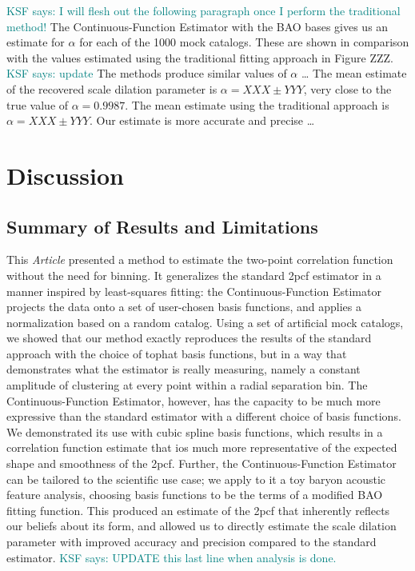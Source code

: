 \documentclass[modern]{aastex62}
\newcommand{\cf}{2pcf\xspace} %
\newcommand{\Est}{The Continuous-Function Estimator\xspace}
\newcommand{\est}{the Continuous-Function Estimator\xspace}
\newcommand{\documentname}{\textsl{Article}\xspace}
\newcommand{\KSF}[1]{\textcolor{teal}{KSF says: #1}}
\begin{document}
\KSF{I will flesh out the following paragraph once I perform the traditional method!}
\Est with the BAO bases gives us an estimate for $\alpha$ for each of the 1000 mock catalogs.
These are shown in comparison with the values estimated using the traditional fitting approach in Figure ZZZ. \KSF{update} 
The methods produce similar values of $\alpha$ \dots 
The mean estimate of the recovered scale dilation parameter is $\alpha=XXX \pm YYY$, very close to the true value of $\alpha = 0.9987$.
The mean estimate using the traditional approach is $\alpha=XXX \pm YYY$.
Our estimate is more accurate and precise \dots 


\section{Discussion} \label{sec:discuss}

\subsection{Summary of Results and Limitations}

This \documentname presented a method to estimate the two-point correlation function without the need for binning.
It generalizes the standard \cf estimator in a manner inspired by least-squares fitting: \est projects the data onto a set of user-chosen basis functions, and applies a normalization based on a random catalog.
Using a set of artificial mock catalogs, we showed that our method exactly reproduces the results of the standard approach with the choice of tophat basis functions, but in a way that demonstrates what the estimator is really measuring, namely a constant amplitude of clustering at every point within a radial separation bin.
\Est, however, has the capacity to be much more expressive than the standard estimator with a different choice of basis functions.
We demonstrated its use with cubic spline basis functions, which results in a correlation function estimate that ios much more representative of the expected shape and smoothness of the \cf.
Further, \est can be tailored to the scientific use case; we apply to it a toy baryon acoustic feature analysis, choosing basis functions to be the terms of a modified BAO fitting function.
This produced an estimate of the \cf that inherently reflects our beliefs about its form, and allowed us to directly estimate the scale dilation parameter with improved accuracy and precision compared to the standard estimator. \KSF{UPDATE this last line when analysis is done.}
\end{document}
